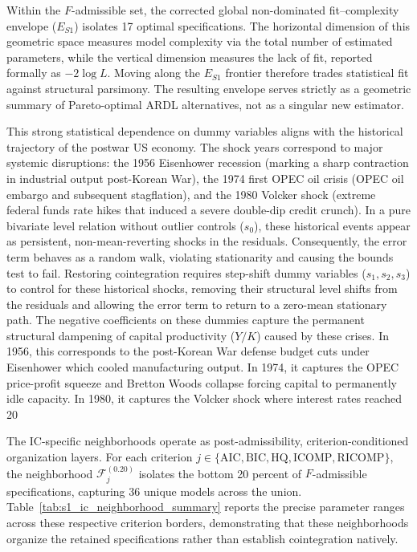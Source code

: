 \documentclass[11pt]{article}
\begin{document}
Within the \(F\)-admissible set, the corrected global non-dominated fit--complexity envelope (\(E_{S1}\)) isolates 17 optimal specifications. The horizontal dimension of this geometric space measures model complexity via the total number of estimated parameters, while the vertical dimension measures the lack of fit, reported formally as \(-2\log L\). Moving along the \(E_{S1}\) frontier therefore trades statistical fit against structural parsimony. The resulting envelope serves strictly as a geometric summary of Pareto-optimal ARDL alternatives, not as a singular new estimator.

This strong statistical dependence on dummy variables aligns with the historical trajectory of the postwar US economy. The shock years correspond to major systemic disruptions: the 1956 Eisenhower recession (marking a sharp contraction in industrial output post-Korean War), the 1974 first OPEC oil crisis (OPEC oil embargo and subsequent stagflation), and the 1980 Volcker shock (extreme federal funds rate hikes that induced a severe double-dip credit crunch). In a pure bivariate level relation without outlier controls ($s_0$), these historical events appear as persistent, non-mean-reverting shocks in the residuals. Consequently, the error term behaves as a random walk, violating stationarity and causing the bounds test to fail. Restoring cointegration requires step-shift dummy variables ($s_1, s_2, s_3$) to control for these historical shocks, removing their structural level shifts from the residuals and allowing the error term to return to a zero-mean stationary path. The negative coefficients on these dummies capture the permanent structural dampening of capital productivity ($Y/K$) caused by these crises. In 1956, this corresponds to the post-Korean War defense budget cuts under Eisenhower which cooled manufacturing output. In 1974, it captures the OPEC price-profit squeeze and Bretton Woods collapse forcing capital to permanently idle capacity. In 1980, it captures the Volcker shock where interest rates reached 20%

The IC-specific neighborhoods operate as post-admissibility, criterion-conditioned organization layers. For each criterion \(j \in \{\mathrm{AIC},\mathrm{BIC},\mathrm{HQ},\mathrm{ICOMP},\mathrm{RICOMP}\}\), the neighborhood \(\mathcal{F}^{(0.20)}_j\) isolates the bottom 20 percent of \(F\)-admissible specifications, capturing 36 unique models across the union. Table~\ref{tab:s1_ic_neighborhood_summary} reports the precise parameter ranges across these respective criterion borders, demonstrating that these neighborhoods organize the retained specifications rather than establish cointegration natively. 
\end{document}
